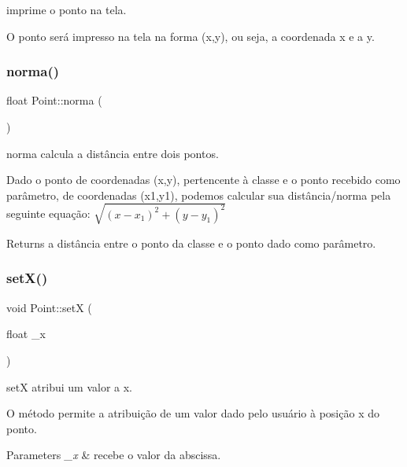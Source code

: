 imprime o ponto na tela. 

O ponto será impresso na tela na forma (x,y), ou seja, a coordenada x e a y. \mbox{\label{class_point_abd2618d1f505d9392893273a66e7c9b2}} 
\subsubsection{\texorpdfstring{norma()}{norma()}}
{\footnotesize\ttfamily float Point\+::norma (\begin{DoxyParamCaption}{ }\end{DoxyParamCaption})}



norma calcula a distância entre dois pontos. 

Dado o ponto de coordenadas (x,y), pertencente à classe e o ponto recebido como parâmetro, de coordenadas (x1,y1), podemos calcular sua distância/norma pela seguinte equação\+: $\sqrt{(x-x_1)^2+(y-y_1)^2}$

\begin{DoxyReturn}{Returns}
a distância entre o ponto da classe e o ponto dado como parâmetro. 
\end{DoxyReturn}
\mbox{\label{class_point_a428a1676e2fdec6753c42011a1d59d18}} 
\subsubsection{\texorpdfstring{set\+X()}{setX()}}
{\footnotesize\ttfamily void Point\+::setX (\begin{DoxyParamCaption}\item[{float}]{\+\_\+x }\end{DoxyParamCaption})}



setX atribui um valor a x. 

O método permite a atribuição de um valor dado pelo usuário à posição x do ponto.


\begin{DoxyParams}{Parameters}
{\em \+\_\+x} & recebe o valor da abscissa. \\
\hline
\end{DoxyParams}
\mbox{\label{class_point_ab5385c6d9bfa841e641e4709fc9f14cc}} 
